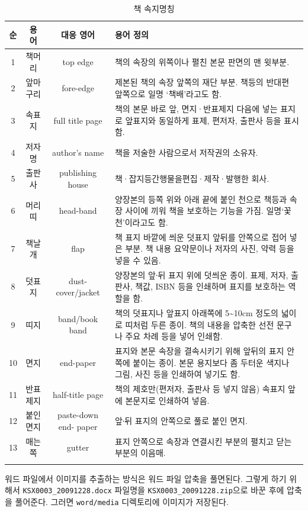 \documentclass[
  letterpaper,
]{book}
\begin{document}
\hypertarget{tbl-glossary-II}{}
\begin{longtable}{cccl}

\toprule
순 & 용 어 & 대응 영어 & 용어 정의 \\ 
\midrule
1 & 책머리 & top edge & 책의 속장의 위쪽이나 펼친 본문 판면의 맨 윗부분. \\ 
2 & 앞마구리 & fore-edge & 제본된 책의 속장 앞쪽의 재단 부분. 책등의 반대편 앞쪽으로 일명 ‘책배’라고도 함. \\ 
3 & 속표지 & full title page & 책의 본문 바로 앞, 면지·반표제지 다음에 넣는 표지로 앞표지와 동일하게 표제, 편저자, 출판사 등을 표시함. \\ 
4 & 저자명 & author's name & 책을 저술한 사람으로서 저작권의 소유자. \\ 
5 & 출판사 & publishing house & 책·잡지등간행물을편집·제작·발행한 회사. \\ 
6 & 머리띠 & head-band & 양장본의 등쪽 위와 아래 끝에 붙인 천으로 책등과 속장 사이에 끼워 책을 보호하는 기능을 가짐. 일명‘꽃천’이라고도 함. \\ 
7 & 책날개 & flap & 책 표지 바깥에 씌운 덧표지 앞뒤를 안쪽으로 접어 넣은 부분. 책 내용 요약문이나 저자의 사진, 약력 등을 넣을 수 있음. \\ 
8 & 덧표지 & dust- cover/jacket & 양장본의 앞∙뒤 표지 위에 덧씌운 종이. 표제, 저자, 출판사, 책값, ISBN 등을 인쇄하며 표지를 보호하는 역할을 함. \\ 
9 & 띠지 & band/book band & 책의 덧표지나 앞표지 아래쪽에 5\textasciitilde{}10cm 정도의 넓이로 띠처럼 두른 종이. 책의 내용을 압축한 선전 문구나 주요 차례 등을 넣어 인쇄함. \\ 
10 & 면지 & end-paper & 표지와 본문 속장을 결속시키기 위해 앞뒤의 표지 안쪽에 붙이는 종이. 본문 용지보다 좀 두터운 색지나 그림, 사진 등을 인쇄하여  넣기도 함. \\ 
11 & 반표제지 & half-title page & 책의 제호만(편저자, 출판사 등 넣지 않음) 속표지 앞에 본문지로 인쇄하여 넣음. \\ 
12 & 붙인면지 & paste-down end- paper & 앞∙뒤 표지의 안쪽으로 풀로 붙인 면지. \\ 
13 & 매는쪽 & gutter & 표지 안쪽으로 속장과 연결시킨 부분의 펼치고 닫는 부분의 이음매. \\ 
\bottomrule
\caption{\label{tbl-glossary-II}책 속지명칭 }\tabularnewline
\end{longtable}

워드 파일에서 이미지를 추출하는 방식은 워드 파일 압축을 풀면된다. 그렇게
하기 위해서 \texttt{KSX0003\_20091228.docx} 파일명을
\texttt{KSX0003\_20091228.zip}으로 바꾼 후에 압축을 풀어준다. 그러면
\texttt{word/media} 디렉토리에 이미지가 저장된다.
\end{document}
